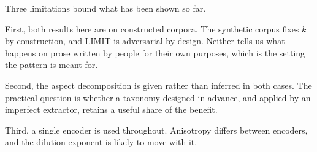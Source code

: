 Three limitations bound what has been shown so far.

First, both results here are on constructed corpora. The synthetic corpus fixes
$k$ by construction, and LIMIT is adversarial by design. Neither tells us what
happens on prose written by people for their own purposes, which is the setting
the pattern is meant for.

Second, the aspect decomposition is given rather than inferred in both cases.
The practical question is whether a taxonomy designed in advance, and applied by
an imperfect extractor, retains a useful share of the benefit.

Third, a single encoder is used throughout. Anisotropy differs between encoders,
and the dilution exponent is likely to move with it.
